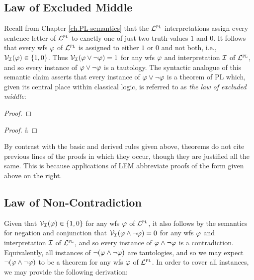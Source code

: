 \subsection{Law of Excluded Middle}
  \label{LEM}

Recall from Chapter \ref{ch.PL-semantics} that the $\mathcal{L}^{\textsc{pl}}$ interpretations assign every sentence letter of $\mathcal{L}^{\textsc{pl}}$ to exactly one of just two truth-values $1$ and $0$.
It follows that every wfs $\varphi$ of $\mathcal{L}^{\textsc{pl}}$ is assigned to either $1$ or $0$ and not both, i.e., $\mathcal{V}_{\mathcal{I}}(\varphi) \in \lbrace1,0\rbrace$. 
Thus $\mathcal{V}_{\mathcal{I}}(\varphi \vee \neg \varphi) = 1$ for any wfs $\varphi$ and interpretation $\mathcal{I}$ of $\mathcal{L}^{\textsc{pl}}$, and so every instance of $\varphi \vee \neg \varphi$ is a tautology. 
The syntactic analogue of this semantic claim asserts that every instance of $\varphi \vee \neg \varphi$ is a theorem of PL which, given its central place within classical logic, is referred to as \textit{the law of excluded middle}:

\begin{multicols}{2}
  
\begin{proof}
	 
\end{proof}

\begin{proof}
  \open 
     
    \open
       
       
       \r{a}
    \close
     
     
  \close
   
\end{proof}

\end{multicols}

By contrast with the basic and derived rules given above, theorems do not cite previous lines of the proofs in which they occur, though they are justified all the same.
This is because applications of LEM abbreviate proofs of the form given above on the right.




\subsection{Law of Non-Contradiction}
  \label{LNC}

Given that $\mathcal{V}_{\mathcal{I}}(\varphi) \in \lbrace1,0\rbrace$ for any wfs $\varphi$ of $\mathcal{L}^{\textsc{pl}}$, it also follows by the semantics for negation and conjunction that $\mathcal{V}_{\mathcal{I}}(\varphi \wedge \neg \varphi) = 0$ for any wfs $\varphi$ and interpretation $\mathcal{I}$ of $\mathcal{L}^{\textsc{pl}}$, and so every instance of $\varphi \wedge \neg \varphi$ is a contradiction. 
Equivalently, all instances of $\neg(\varphi \wedge \neg \varphi)$ are tautologies, and so we may expect $\neg(\varphi \wedge \neg \varphi)$ to be a theorem for any wfs $\varphi$ of $\mathcal{L}^{\textsc{pl}}$. 
In order to cover all instances, we may provide the following derivation:

